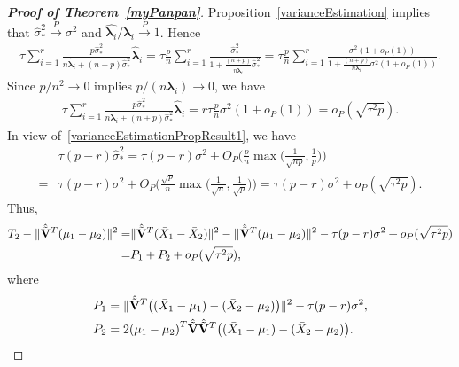 \documentclass[3p]{elsarticle}
\newcommand{\bfsym}[1]{\ensuremath{\boldsymbol{#1}}}
\def\blambda {\bfsym {\lambda}}        \def\bLambda {\bfsym {\Lambda}}
\theoremstyle{plain}
\theoremstyle{definition}
\theoremstyle{remark}
\begin{document}
\begin{appendices}
\begin{proof}[\textbf{Proof of Theorem~\ref{myPanpan}}]
    Proposition~\ref{varianceEstimation} implies that $\hat{\sigma}_{*}^2\xrightarrow{P} \sigma^2$ and $\hat{\blambda_i}/\blambda_i\xrightarrow{P} 1$.
    Hence
    $$
    \begin{aligned} 
 \tau\sum_{i=1}^r \frac{p\hat{\sigma}_*^2}{n\hat{\blambda}_i+(n+p)\hat{\sigma}_*^2}\hat{\blambda}_i
        =
        \tau\frac{p}{n}\sum_{i=1}^r \frac{\hat{\sigma}_*^2}{1+\frac{(n+p)}{n\hat{\blambda}_i}\hat{\sigma}_*^2}
        =
        \tau\frac{p}{n}\sum_{i=1}^r \frac{\sigma^2(1+o_P(1))}{1+\frac{(n+p)}{n\blambda_i}\sigma^2(1+o_P(1))}.
    \end{aligned}
    $$
    Since $p/n^2\to 0$ implies $p/(n\blambda_i)\to 0$, we have
    $$
    \begin{aligned} 
 \tau\sum_{i=1}^r \frac{p\hat{\sigma}_*^2}{n\hat{\blambda}_i+(n+p)\hat{\sigma}_*^2}\hat{\blambda}_i
        =r\tau \frac{p}{n} \sigma^2(1+o_P(1))=o_P(\sqrt{\tau^2 p}).
    \end{aligned}
    $$
    In view of~\eqref{varianceEstimationPropResult1}, we have
    $$
    \begin{aligned}
        &\tau(p-r)\hat{\sigma}_*^2 =
    \tau(p-r)\sigma^2 + O_P\Big(\frac{p}{n}\max\big(\frac{1}{\sqrt{np}},\frac{1}{p}\big)\Big)\\
        =&
        \tau(p-r)\sigma^2 + O_P\Big(\frac{\sqrt{p}}{n}\max\big(\frac{1}{\sqrt{n}},\frac{1}{\sqrt{p}}\big)\Big)
        =\tau(p-r)\sigma^2 + o_P(\sqrt{\tau^2 p}).
    \end{aligned}
    $$
Thus,
\begin{equation*}
    \begin{aligned}
        T_2-\|\hat{\tilde{\mathbf{V}}}^T(\mu_1-\mu_2)\|^2
        =&
        \|\hat{\tilde{\mathbf{V}}}^T(\bar{X}_1-\bar{X}_2)\|^2-\|\hat{\tilde{\mathbf{V}}}^T(\mu_1-\mu_2)\|^2
-\tau (p-r)\sigma^2
        +o_P(\sqrt{\tau^2 p})\\
        =&P_1+P_2
        +o_P(\sqrt{\tau^2 p}),
    \end{aligned}
\end{equation*}
where
\begin{align*}
    P_1&=\|\hat{\tilde{\mathbf{V}}}^T\big((\bar{X}_1-\mu_1)-(\bar{X}_2-\mu_2)\big)\|^2- \tau (p-r)\sigma^2,\\
    P_2&=2{(\mu_1-\mu_2)}^T \hat{\tilde{\mathbf{V}}}\hat{\tilde{\mathbf{V}}}^T\big((\bar{X}_1-\mu_1)-(\bar{X}_2-\mu_2)\big).
\end{align*}



\end{proof}
\end{appendices}
\end{document}
